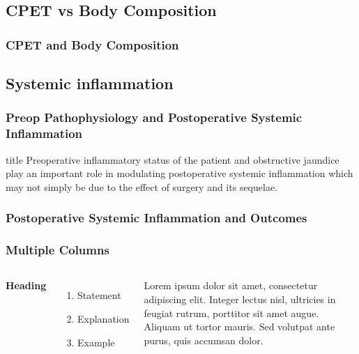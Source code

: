 \documentclass{beamer}
\begin{document}
\begin{frame}
\end{frame}

\subsection{CPET vs Body Composition}
\begin{frame}
	\frametitle{CPET and Body Composition}
\end{frame}

\subsection{Systemic inflammation}

\begin{frame}
	\frametitle{Preop Pathophysiology and Postoperative Systemic Inflammation}
	\begin{block}{title}
		Preoperative inflammatory status of the patient and obstructive jaundice play an important role in modulating postoperative systemic inflammation which may not simply be due to the effect of surgery and its sequelae.
	\end{block}
\end{frame}

\begin{frame}
	\frametitle{Postoperative Systemic Inflammation and Outcomes}
\end{frame}




\begin{frame}
\frametitle{Multiple Columns}
\begin{columns}[c] %

\textbf{Heading}
\begin{enumerate}
\item Statement
\item Explanation
\item Example
\end{enumerate}

Lorem ipsum dolor sit amet, consectetur adipiscing elit. Integer lectus nisl, ultricies in feugiat rutrum, porttitor sit amet augue. Aliquam ut tortor mauris. Sed volutpat ante purus, quis accumsan dolor.

\end{columns}
\end{frame}
\end{document}
